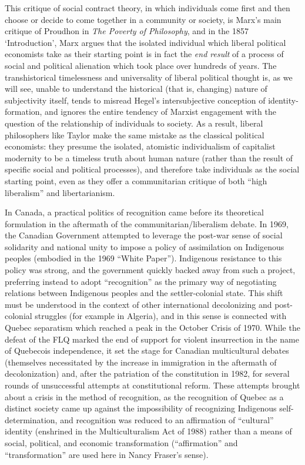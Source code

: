 \documentclass[12pt,oneside]{memoir}
\begin{document}
This critique of social contract theory, in which individuals come first and then choose or decide to come together in a community or society, is Marx's main critique of Proudhon in \textit{The Poverty of Philosophy}, and in the 1857 `Introduction', Marx argues that the isolated individual which liberal political economists take as their starting point is in fact the \textit{end result} of a process of social and political alienation which took place over hundreds of years. The transhistorical timelessness and universality of liberal political thought is, as we will see, unable to understand the historical (that is, changing) nature of subjectivity itself, tends to misread Hegel's intersubjective conception of identity-formation, and ignores the entire tendency of Marxist engagement with the question of the relationship of individuals to society. As a result, liberal philosophers like Taylor make the same mistake as the classical political economists: they presume the isolated, atomistic individualism of capitalist modernity to be a timeless truth about human nature (rather than the result of specific social and political processes), and therefore take individuals as the social starting point, even as they offer a communitarian critique of both ``high liberalism'' and libertarianism.

In Canada, a practical politics of recognition came before its theoretical formulation in the aftermath of the communitarian/liberalism debate. In 1969, the Canadian Government attempted to leverage the post-war sense of social solidarity and national unity to impose a policy of assimilation on Indigenous peoples (embodied in the 1969 ``White Paper''). Indigenous resistance to this policy was strong, and the government quickly backed away from such a project, preferring instead to adopt ``recognition'' as the primary way of negotiating relations between Indigenous peoples and the settler-colonial state. This shift must be understood in the context of other international decolonizing and post-colonial struggles (for example in Algeria), and in this sense is connected with Quebec separatism which reached a peak in the October Crisis of 1970. While the defeat of the FLQ marked the end of support for violent insurrection in the name of Quebecois independence, it set the stage for Canadian multicultural debates (themselves necessitated by the increase in immigration in the aftermath of decolonization) and, after the patriation of the constitution in 1982, for several rounds of unsuccessful attempts at constitutional reform. These attempts brought about a crisis in the method of recognition, as the recognition of Quebec as a distinct society came up against the impossibility of recognizing Indigenous self-determination, and recognition was reduced to an affirmation of ``cultural'' identity (enshrined in the Multiculturalism Act of 1988) rather than a means of social, political, and economic transformation (``affirmation'' and ``transformation'' are used here in Nancy Fraser's sense).
\end{document}
